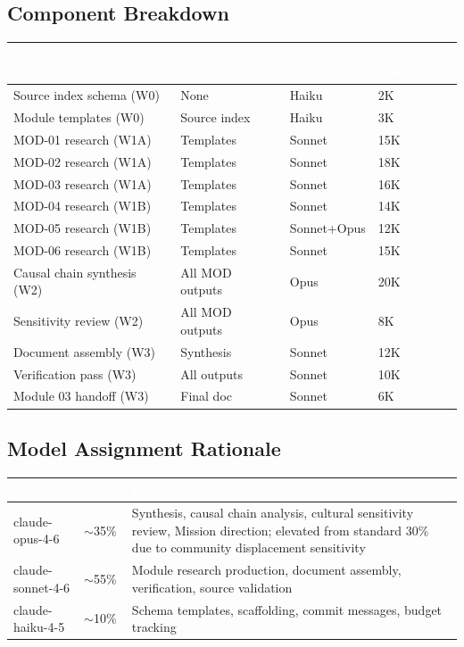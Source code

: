 \documentclass[11pt,letterpaper]{article}
\newcommand{\tableheader}[1]{\textbf{\sffamily\textcolor{white}{#1}}}
\begin{document}
\subsection{Component Breakdown}

\begin{center}
\begin{tabularx}{\textwidth}{L{3cm}L{3cm}C{2cm}C{2cm}}
\toprule
{}
\tableheader{Component} & \tableheader{Dependencies} & \tableheader{Model} & \tableheader{Est. Tokens} \\
\midrule
Source index schema (W0) & None & Haiku & 2K \\
Module templates (W0) & Source index & Haiku & 3K \\
MOD-01 research (W1A) & Templates & Sonnet & 15K \\
MOD-02 research (W1A) & Templates & Sonnet & 18K \\
MOD-03 research (W1A) & Templates & Sonnet & 16K \\
MOD-04 research (W1B) & Templates & Sonnet & 14K \\
MOD-05 research (W1B) & Templates & Sonnet+Opus & 12K \\
MOD-06 research (W1B) & Templates & Sonnet & 15K \\
Causal chain synthesis (W2) & All MOD outputs & Opus & 20K \\
Sensitivity review (W2) & All MOD outputs & Opus & 8K \\
Document assembly (W3) & Synthesis & Sonnet & 12K \\
Verification pass (W3) & All outputs & Sonnet & 10K \\
Module 03 handoff (W3) & Final doc & Sonnet & 6K \\
\bottomrule
\end{tabularx}
\end{center}

\subsection{Model Assignment Rationale}

\begin{center}
\begin{tabularx}{\textwidth}{L{2.5cm}C{1.5cm}X}
\toprule
{}
\tableheader{Model} & \tableheader{Share} & \tableheader{Rationale} \\
\midrule
claude-opus-4-6 & $\sim$35\% & Synthesis, causal chain analysis, cultural sensitivity review, Mission direction; elevated from standard 30\% due to community displacement sensitivity \\
claude-sonnet-4-6 & $\sim$55\% & Module research production, document assembly, verification, source validation \\
claude-haiku-4-5 & $\sim$10\% & Schema templates, scaffolding, commit messages, budget tracking \\
\bottomrule
\end{tabularx}
\end{center}
\end{document}
